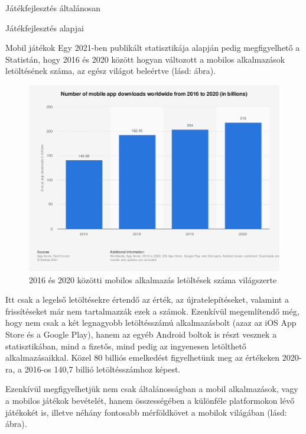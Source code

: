 \begin{MyChapter}{Játékfejlesztés általánosan}
\begin{MySection}{Játékfejlesztés alapjai}
\begin{MySubSection}{Mobil játékok}
		Egy 2021-ben publikált statisztikája \cite{mobile_app_downloads} alapján pedig megfigyelhető a Statistán, hogy 2016 és 2020 között hogyan változott a mobilos alkalmazások letöltésének száma, az egész világot beleértve (lásd:  ábra).
		\begin{figure}[h!]
			\centering
			\includegraphics[scale=0.40]{kepek/mobil/annual_number_of_global_mobile_app_downloads_2016-2020.png}
			\caption{2016 és 2020 közötti mobilos alkalmazás letöltések száma világszerte}
			\label{fig:mobil:annual_number_of_global_mobile_app_downloads_2016-2020}
		\end{figure}
	
		Itt csak a legelső letöltésekre értendő az érték, az újratelepítéseket, valamint a frissítéseket már nem tartalmazzák ezek a számok. Ezenkívül megemlítendő még, hogy nem csak a két legnagyobb letöltésszámú alkalmazásbolt (azaz az iOS App Store és a Google Play), hanem az egyéb Android boltok is részt vesznek a statisztikában, mind a fizetős, mind pedig az ingyenesen letölthető alkalmazásaikkal. Közel 80 billiós emelkedést figyelhetünk meg az értékeken 2020-ra, a 2016-os 140,7 billió letöltésszámhoz képest.
		
		Ezenkívül megfigyelhetjük nem csak általánosságban a mobil alkalmazások, vagy a mobilos játékok bevételét, hanem összességében a különféle platformokon lévő játékokét is, illetve néhány fontosabb mérföldkövet a mobilok világában (lásd:  ábra).
		\cite{mobile_gaming_industry}
		

\end{MySubSection}
\end{MySection}
\end{MyChapter}
